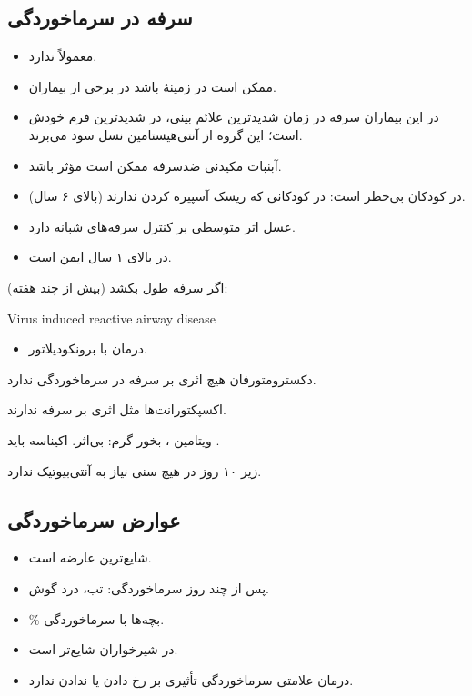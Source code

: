 \documentclass[12pt,a4paper]{article}
\begin{document}
\subsection*{سرفه در سرماخوردگی}
\begin{itemize}
\item معمولاً  ندارد.
\item ممکن است در زمینهٔ  باشد در برخی از بیماران.
\item در این بیماران سرفه در زمان شدیدترین علائم بینی، در شدیدترین فرم خودش است؛ این گروه از آنتی‌هیستامین نسل  سود می‌برند.
\end{itemize}

\begin{itemize}
\item آبنبات مکیدنی ضدسرفه ممکن است مؤثر باشد.
\item در کودکان بی‌خطر است: در کودکانی که ریسک آسپیره کردن ندارند (بالای ۶ سال).
\item عسل اثر متوسطی بر کنترل سرفه‌های شبانه دارد.
\item در بالای ۱ سال ایمن است.
\end{itemize}
اگر سرفه طول بکشد (بیش از چند هفته):
\begin{latin}\noindent Virus induced reactive airway disease\end{latin}
\begin{itemize}
\item درمان با برونکودیلاتور.
\end{itemize}
دکسترومتورفان هیچ اثری بر سرفه در سرماخوردگی ندارد.

اکسپکتورانت‌ها مثل  اثری بر سرفه ندارند.

ویتامین ، بخور گرم: بی‌اثر. اکیناسه باید .

 زیر ۱۰ روز در هیچ سنی نیاز به آنتی‌بیوتیک ندارد.
\subsection*{عوارض سرماخوردگی}
\begin{itemize}
\item {} شایع‌ترین عارضه است.
\item پس از چند روز سرماخوردگی: تب، درد گوش.
\item {}\% بچه‌ها با سرماخوردگی.
\item در شیرخواران شایع‌تر است.
\item درمان علامتی سرماخوردگی تأثیری بر رخ دادن یا ندادن  ندارد.
\end{itemize}
\end{document}
